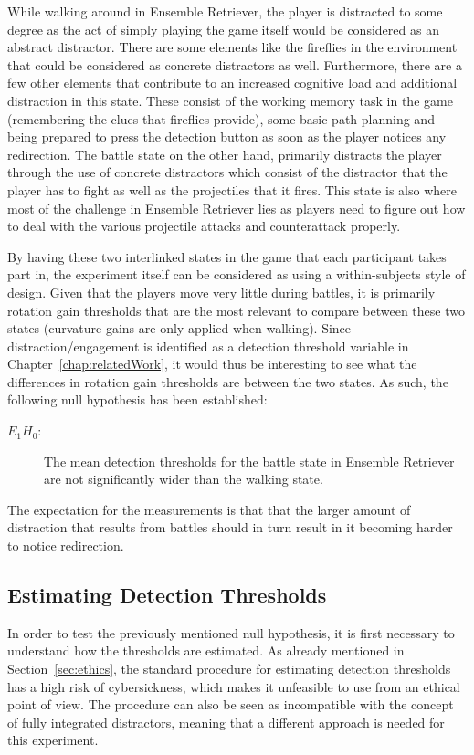 While walking around in Ensemble Retriever, the player is distracted to some degree as the act of simply playing the game itself would be considered as an abstract distractor. There are some elements like the fireflies in the environment that could be considered as concrete distractors as well. Furthermore, there are a few other elements that contribute to an increased cognitive load and additional distraction in this state. These consist of the working memory task in the game (remembering the clues that fireflies provide), some basic path planning and being prepared to press the detection button as soon as the player notices any redirection. The battle state on the other hand, primarily distracts the player through the use of concrete distractors which consist of the distractor that the player has to fight as well as the projectiles that it fires. This state is also where most of the challenge in Ensemble Retriever lies as players need to figure out how to deal with the various projectile attacks and counterattack properly. 

By having these two interlinked states in the game that each participant takes part in, the experiment itself can be considered as using a within-subjects style of design. Given that the players move very little during battles, it is primarily rotation gain thresholds that are the most relevant to compare between these two states (curvature gains are only applied when walking). Since distraction/engagement is identified as a detection threshold variable in Chapter~\ref{chap:relatedWork}, it would thus be interesting to see what the differences in rotation gain thresholds are between the two states. As such, the following null hypothesis has been established:

\begin{description}
\item[$E_1H_0$: ] The mean detection thresholds for the battle state in Ensemble Retriever are not significantly wider than the walking state.
\end{description}

The expectation for the measurements is that that the larger amount of distraction that results from battles should in turn result in it becoming harder to notice redirection. 

\subsection{Estimating Detection Thresholds}\label{sec:ex1EstimationMethod}
In order to test the previously mentioned null hypothesis, it is first necessary to understand how the thresholds are estimated. As already mentioned in Section~\ref{sec:ethics}, the standard procedure for estimating detection thresholds has a high risk of cybersickness, which makes it unfeasible to use from an ethical point of view. The procedure can also be seen as incompatible with the concept of fully integrated distractors, meaning that a different approach is needed for this experiment.  

